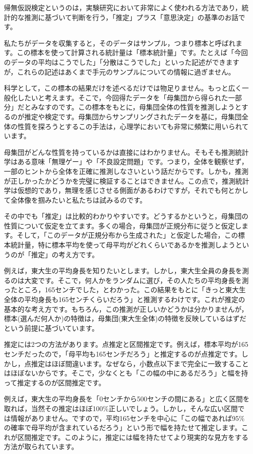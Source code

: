 \documentclass{ltjsbook}
\begin{document}
帰無仮説検定というのは，実験研究において非常によく使われる方法であり，統計的な推測に基づいて判断を行う，「推定」プラス「意思決定」の基準のお話です。

私たちがデータを収集すると，そのデータはサンプル，つまり標本と呼ばれます。この標本を使って計算される統計量は「標本統計量」です。たとえば「今回のデータの平均はこうでした」「分散はこうでした」といった記述ができますが，これらの記述はあくまで手元のサンプルについての情報に過ぎません。

科学として，この標本の結果だけを述べるだけでは物足りません。もっと広く一般化したいと考えます。そこで，今回得たデータを「母集団から得られた一部分」だとみなすのです。この標本をもとに，母集団全体の性質を推測しようとするのが推定や検定です。母集団からサンプリングされたデータを基に，母集団全体の性質を探ろうとするこの手法は，心理学においても非常に頻繁に用いられています。

母集団がどんな性質を持っているかは直接にはわかりません。そもそも推測統計学はある意味「無理ゲー」や「不良設定問題」です。つまり，全体を観察せず，一部のヒントから全体を正確に推測しなさいという話だからです。しかも，推測が正しかったかどうかを完璧に検証することはできません。この点で，推測統計学は仮想的であり，無理を感じさせる側面があるわけですが，それでも何とかして全体像を掴みたいと私たちは試みるのです。

その中でも「推定」は比較的わかりやすいです。どうするかというと，母集団の性質について仮定を立てます。多くの場合，母集団が正規分布に従うと仮定します。そして，「このデータが正規分布から生成された」と仮定した場合，この標本統計量，特に標本平均を使って母平均がどれくらいであるかを推測しようというのが「推定」の考え方です。

例えば，東大生の平均身長を知りたいとします。しかし，東大生全員の身長を測るのは大変です。そこで，何人かをランダムに選び，その人たちの平均身長を測ったところ，165センチでした，とわかった。この結果をもとに「きっと東大生全体の平均身長も165センチくらいだろう」と推測するわけです。これが推定の基本的な考え方です。もちろん，この推測が正しいかどうかは分かりませんが，標本(選んだ何人か)の特徴は，母集団(東大生全体)の特徴を反映しているはずだという前提に基づいています。

推定には2つの方法があります。点推定と区間推定です。例えば，標本平均が165センチだったので，「母平均も165センチだろう」と推定するのが点推定です。しかし，点推定はほぼ間違います。なぜなら，小数点以下まで完全に一致することはほぼないからです。そこで，少なくとも「この幅の中にあるだろう」と幅を持って推定するのが区間推定です。

例えば，東大生の平均身長を「0センチから500センチの間にある」と広く区間を取れば，当然その推定はほぼ100\%正しいでしょう。しかし，そんな広い区間では情報がありません。ですので，平均165センチを中心に「この幅であれば95\%の確率で母平均が含まれているだろう」という形で幅を持たせて推定します。これが区間推定です。このように，推定には幅を持たせてより現実的な見方をする方法が取られています。
\end{document}

